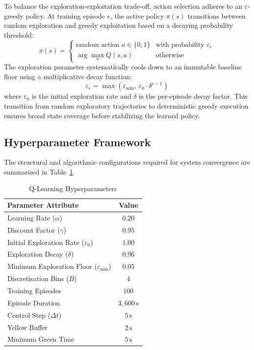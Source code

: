 \documentclass[12pt]{article}
\begin{document}
To balance the exploration-exploitation trade-off, action selection adheres to an $\varepsilon$-greedy policy. At training episode $e$, the active policy $\pi(s)$ transitions between random exploration and greedy exploitation based on a decaying probability threshold:
\begin{equation}
	\pi(s) = \begin{cases}
		\text{random action } a \in \{0, 1\} & \text{with probability } \varepsilon_e \\
		\arg\max_{a} Q(s, a) & \text{otherwise}
	\end{cases}
\end{equation}
The exploration parameter systematically cools down to an immutable baseline floor using a multiplicative decay function:
\begin{equation}
	\varepsilon_e = \max\left(\varepsilon_{\min}, \, \varepsilon_0 \cdot \delta^{e-1}\right)
\end{equation}
where $\varepsilon_0$ is the initial exploration rate and $\delta$ is the per-episode decay factor. This transition from random exploratory trajectories to deterministic greedy execution ensures broad state coverage before stabilizing the learned policy.


\subsection{Hyperparameter Framework}
The structural and algorithmic configurations required for system convergence are summarised in Table~\ref{tab:hyperparams}.

\begin{table}[H]
	\centering
	\caption{Q-Learning Hyperparameters}
	\label{tab:hyperparams}
	\begin{tabular}{lc}
		\toprule
		\textbf{Parameter Attribute} & \textbf{Value} \\
		\midrule
		Learning Rate (\( \alpha \)) & \( 0.20 \) \\
		Discount Factor (\( \gamma \)) & \( 0.95 \) \\
		Initial Exploration Rate (\( \varepsilon_0 \)) & \( 1.00 \) \\
		Exploration Decay (\( \delta \)) & \( 0.96 \) \\
		Minimum Exploration Floor (\( \varepsilon_{\min} \)) & \( 0.05 \) \\
		Discretisation Bins (\( B \)) & \( 4 \) \\
		Training Episodes & \( 100 \) \\
		Episode Duration & \( 3{,}600\,\text{s} \) \\
		Control Step (\( \Delta t \)) & \( 5\,\text{s} \) \\
		Yellow Buffer & \( 2\,\text{s} \) \\
		Minimum Green Time & \( 5\,\text{s} \) \\
		\bottomrule
	\end{tabular}
\end{table}
\end{document}
